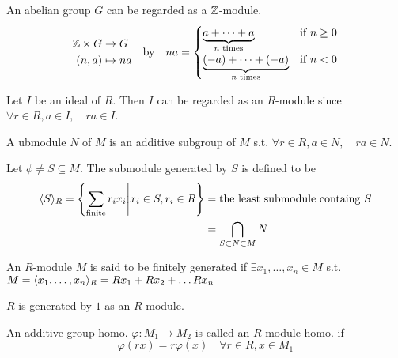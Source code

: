 \begin{example}
  An abelian group $G$ can be regarded as a $\mathbb{Z}$-module.
  \[
    \begin{aligned}
      \mathbb{Z} \times G &\to G\\
      (n, a) &\mapsto na
    \end{aligned}
    \quad \text{by} \quad
    na = \begin{cases}
      \underbrace{a + \dots + a}_{n\text{~times}} & \text{if~} n \ge 0 \\
      \underbrace{(-a) + \dots + (-a)}_{n\text{~times}} & \text{if~} n < 0
    \end{cases}
  \]
\end{example}

\begin{example}
  Let $I$ be an ideal of $R$. Then $I$ can be regarded as an $R$-module
  since $\forall r \in R, a \in I, \quad ra \in I$.
\end{example}

\begin{definition}
  A ubmodule $N$ of $M$ is an additive subgroup of $M$ s.t.
  $\forall r \in R, a \in N, \quad ra \in N$.
\end{definition}

\begin{prop}
  Let $\phi \ne S \subseteq M$. The submodule generated by $S$ is defined to be
  \begin{align*}
    \langle S\rangle_R = \left\{
      \sum_{\text{finite}} r_i x_i \middle| x_i \in S, r_i \in R
    \right\} &= \text{the least submodule containg $S$} \\
             &= \bigcap_{S \subset N \subset M} N
  \end{align*}
\end{prop}

\begin{definition}
  An $R$-module $M$ is said to be finitely generated if
  $\exists x_1, \dots, x_n \in M$ s.t.
  $M = \langle x_1, \dots, x_n\rangle_R = Rx_1 + Rx_2 + \dots Rx_n$
\end{definition}

\begin{example}
  $R$ is generated by $1$ as an $R$-module.
\end{example}

\begin{definition}
  An additive group homo. $\varphi: M_1 \to M_2$ is called an $R$-module
  homo. if
  \[ \varphi(rx) = r\varphi(x) \quad \forall r \in R, x \in M_1 \]
\end{definition}


